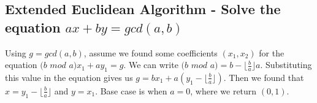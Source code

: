 \documentclass[12pt]{article}%
\begin{document}
\subsection{Extended Euclidean Algorithm - Solve the equation $ax + by = gcd(a,b)$}

Using $g = gcd(a,b)$, assume we found some coefficients $(x_1,x_2)$ for the equation $(b$ $mod$ $a)x_1 + ay_1 = g$. We can write $(b$ $mod$ $a) = b - \lfloor \frac{b}{a} \rfloor a$. Substituting this value in the equation gives us $g = bx_1 + a (y_1 - \lfloor \frac{b}{a} \rfloor)$. Then we found that $x = y_1 - \lfloor \frac{b}{a} \rfloor$ and $y = x_1$. Base case is when $a = 0$, where we return $(0,1)$.
\end{document}
